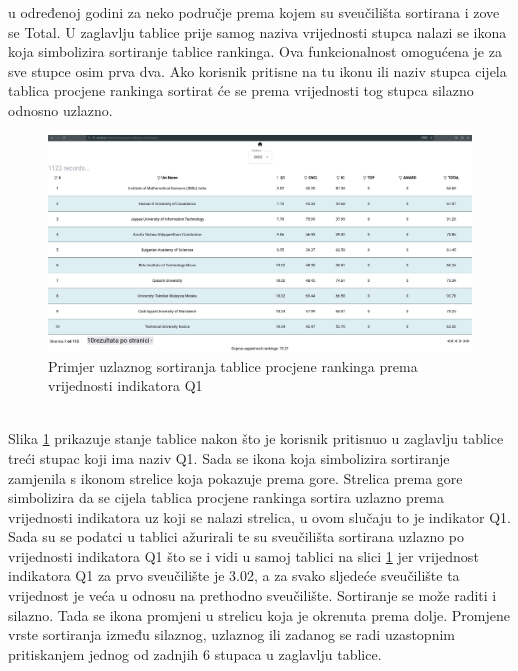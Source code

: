 \documentclass[times, utf8, zavrsni]{fer}
\begin{document}
u određenoj godini za neko područje prema kojem su sveučilišta sortirana i zove se Total. U zaglavlju tablice prije samog naziva vrijednosti stupca nalazi se ikona koja simbolizira
sortiranje tablice rankinga. Ova funkcionalnost omogućena je za sve stupce osim prva dva. Ako korisnik pritisne na tu ikonu ili naziv stupca cijela tablica 
procjene rankinga sortirat će se prema vrijednosti tog stupca silazno odnosno uzlazno. 
\begin{figure}[htb]
    \hspace*{-2cm}  
       \includegraphics[scale=0.21]{sort1.png} 
       \caption{Primjer uzlaznog sortiranja tablice procjene rankinga prema vrijednosti indikatora Q1}
       \label{fig:sort1}
       \end{figure}
\\Slika \ref{fig:sort1} prikazuje stanje tablice nakon što je korisnik pritisnuo u zaglavlju tablice treći stupac koji ima naziv Q1. Sada se ikona koja simbolizira
sortiranje zamjenila s ikonom strelice koja pokazuje prema gore. Strelica prema gore simbolizira da se cijela tablica procjene rankinga
sortira uzlazno prema vrijednosti indikatora uz koji se nalazi strelica, u ovom slučaju to je indikator Q1. Sada su se podatci u tablici 
ažurirali te su sveučilišta sortirana uzlazno po vrijednosti indikatora Q1 što se i vidi u samoj tablici na slici \ref{fig:sort1} jer vrijednost indikatora Q1 za prvo 
sveučilište je 3.02, a za svako sljedeće sveučilište ta vrijednost je veća u odnosu na prethodno sveučilište. Sortiranje se može raditi i silazno. Tada se ikona promjeni
u strelicu koja je okrenuta prema dolje. Promjene vrste sortiranja između silaznog, uzlaznog ili zadanog  se radi uzastopnim pritiskanjem 
jednog od zadnjih 6 stupaca u zaglavlju tablice.
\end{document}
